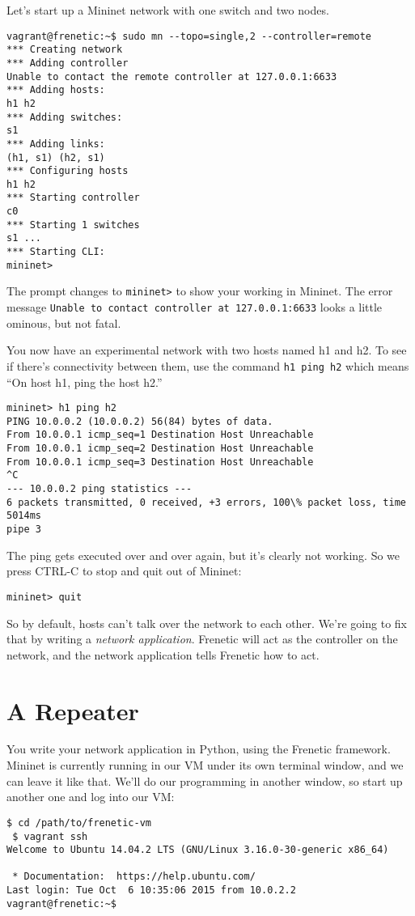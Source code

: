 Let's start up a Mininet network with one switch and two nodes.
\\
\begin{lstlisting}[style=BashInputStyle]
vagrant@frenetic:~$ sudo mn --topo=single,2 --controller=remote
*** Creating network
*** Adding controller
Unable to contact the remote controller at 127.0.0.1:6633
*** Adding hosts:
h1 h2
*** Adding switches:
s1
*** Adding links:
(h1, s1) (h2, s1)
*** Configuring hosts
h1 h2
*** Starting controller
c0
*** Starting 1 switches
s1 ...
*** Starting CLI:
mininet>
\end{lstlisting}

The prompt changes to {\tt mininet>} to show your working in Mininet.  
The error message {\tt Unable to contact controller at 127.0.0.1:6633} looks a little ominous, but not fatal.  

You now have an experimental network with two hosts named h1 and h2.  
To see if there's connectivity between them, use the command \lstinline{h1 ping h2} which means ``On host h1, ping the host h2.''
\\
\begin{lstlisting}[style=BashInputStyle]
mininet> h1 ping h2
PING 10.0.0.2 (10.0.0.2) 56(84) bytes of data.
From 10.0.0.1 icmp_seq=1 Destination Host Unreachable
From 10.0.0.1 icmp_seq=2 Destination Host Unreachable
From 10.0.0.1 icmp_seq=3 Destination Host Unreachable
^C
--- 10.0.0.2 ping statistics ---
6 packets transmitted, 0 received, +3 errors, 100\% packet loss, time 5014ms
pipe 3
\end{lstlisting}

The ping gets executed over and over again, but it's clearly not working.  So we press CTRL-C to stop and 
quit out of Mininet:
\\
\begin{lstlisting}[style=BashInputStyle]
mininet> quit
\end{lstlisting}

So by default, hosts can't talk over the network to each other.  We're going to fix that by writing a {\it network
application}.    Frenetic will act as the controller on the network, and the network application tells Frenetic how to act.

\section{A Repeater}

You write your network application in Python, using the Frenetic framework.  Mininet is currently running in our VM under its own terminal window, and we can leave it like that.   
We'll do our programming in another window, so start up another one and log into our VM:
\\
\begin{lstlisting}[style=BashInputStyle]
 $ cd /path/to/frenetic-vm
 $ vagrant ssh
Welcome to Ubuntu 14.04.2 LTS (GNU/Linux 3.16.0-30-generic x86_64)

 * Documentation:  https://help.ubuntu.com/
Last login: Tue Oct  6 10:35:06 2015 from 10.0.2.2
vagrant@frenetic:~$ 
\end{lstlisting}

